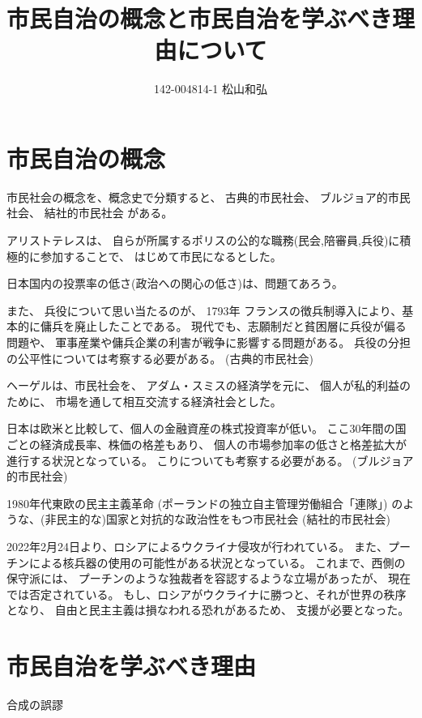 \documentclass{jsarticle}
\begin{document}
\title{市民自治の概念と市民自治を学ぶべき理由について}
\author{142-004814-1 松山和弘}
\maketitle

\section{市民自治の概念}

市民社会の概念を、概念史で分類すると、
古典的市民社会、
ブルジョア的市民社会、
結社的市民社会
がある。

アリストテレスは、
自らが所属するポリスの公的な職務(民会,陪審員,兵役)に積極的に参加することで、
はじめて市民になるとした。

日本国内の投票率の低さ(政治への関心の低さ)は、問題てあろう。

また、
兵役について思い当たるのが、
1793年 フランスの徴兵制導入により、基本的に傭兵を廃止したことである。
現代でも、志願制だと貧困層に兵役が偏る問題や、
軍事産業や傭兵企業の利害が戦争に影響する問題がある。
兵役の分担の公平性については考察する必要がある。
(古典的市民社会)

ヘーゲルは、市民社会を、
アダム・スミスの経済学を元に、
個人が私的利益のために、
市場を通して相互交流する経済社会とした。

日本は欧米と比較して、個人の金融資産の株式投資率が低い。
ここ30年間の国ごとの経済成長率、株価の格差もあり、
個人の市場参加率の低さと格差拡大が進行する状況となっている。
こりについても考察する必要がある。
(ブルジョア的市民社会)

1980年代東欧の民主主義革命
(ポーランドの独立自主管理労働組合「連隊」)
のような、(非民主的な)国家と対抗的な政治性をもつ市民社会
(結社的市民社会)

2022年2月24日より、ロシアによるウクライナ侵攻が行われている。
また、プーチンによる核兵器の使用の可能性がある状況となっている。
これまで、西側の保守派には、
プーチンのような独裁者を容認するような立場があったが、
現在では否定されている。
もし、ロシアがウクライナに勝つと、それが世界の秩序となり、
自由と民主主義は損なわれる恐れがあるため、
支援が必要となった。



\section{市民自治を学ぶべき理由}

合成の誤謬
\end{document}
